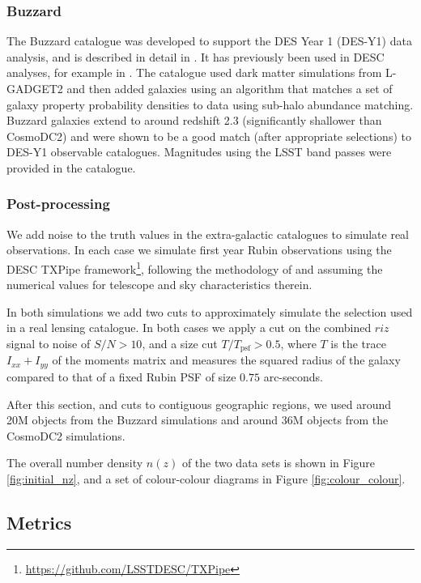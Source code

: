 \documentclass[twocolumn,twocolappendix]{aastex63}
\begin{document}
\subsubsection{Buzzard}

The Buzzard catalogue was developed to support the DES Year 1 (DES-Y1)
data analysis, and is described in detail in \citet{buzzard}.
It has previously been used in DESC analyses, for example in \citet{dc1_pz}.
The catalogue used dark
matter simulations from L-GADGET2 \cite{gadget2} and then added galaxies using
an algorithm that matches a set of galaxy
property probability densities to data using sub-halo abundance matching. 
Buzzard galaxies extend to around redshift 2.3 (significantly shallower than CosmoDC2)
and were shown to be a good
match (after appropriate selections) to DES-Y1 observable catalogues.  Magnitudes
using the LSST band passes were provided in the catalogue.

\subsubsection{Post-processing} \label{sec:data-proc}

We add noise to the truth values in the extra-galactic catalogues to simulate real observations.
In each case we simulate first year Rubin observations
using the DESC {\sc TXPipe} framework\footnote{\url{https://github.com/LSSTDESC/TXPipe}}, following the methodology of \citet{ivezic_jones_lupton}
and assuming the numerical values for telescope and sky characteristics therein.

In both simulations we add two cuts to approximately simulate the selection used in a real
lensing catalogue.  In both cases we apply a cut on the combined $riz$ signal to noise of
$S/N > 10$, and a size cut $T / T_\mathrm{psf} > 0.5$, where
$T$ is the trace $I_{xx} + I_{yy}$ of the moments matrix and measures the squared radius of the
galaxy compared to that of a fixed Rubin PSF of size $0.75$ arc-seconds.

After this section, and cuts to contiguous geographic regions, we used around 20M objects from the Buzzard
simulations and around 36M objects from the CosmoDC2 simulations.


The overall number density $n(z)$ of the two data sets is shown in Figure \ref{fig:initial_nz},
and a set of colour-colour diagrams  in Figure \ref{fig:colour_colour}.

\subsection{Metrics}
\label{sec:metrics}
\end{document}
